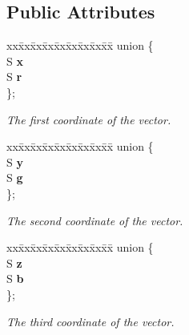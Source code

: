 \subsection*{Public Attributes}
\begin{DoxyCompactItemize}
\item 
\mbox{\label{classmath_1_1_vec3_a540f559cb87f94bfa8b61dbdfa9926c0}} 
\begin{tabbing}
xx\=xx\=xx\=xx\=xx\=xx\=xx\=xx\=xx\=\kill
union \{\\
\>S {\bfseries x}\\
\>S {\bfseries r}\\
\}; \\

\end{tabbing}\begin{DoxyCompactList}\small\item\em The first coordinate of the vector. \end{DoxyCompactList}\item 
\mbox{\label{classmath_1_1_vec3_aceb46a7ac1d3efd1e48179bd823dc298}} 
\begin{tabbing}
xx\=xx\=xx\=xx\=xx\=xx\=xx\=xx\=xx\=\kill
union \{\\
\>S {\bfseries y}\\
\>S {\bfseries g}\\
\}; \\

\end{tabbing}\begin{DoxyCompactList}\small\item\em The second coordinate of the vector. \end{DoxyCompactList}\item 
\mbox{\label{classmath_1_1_vec3_a6c67c986fe777e5dd85a432e46487858}} 
\begin{tabbing}
xx\=xx\=xx\=xx\=xx\=xx\=xx\=xx\=xx\=\kill
union \{\\
\>S {\bfseries z}\\
\>S {\bfseries b}\\
\}; \\

\end{tabbing}\begin{DoxyCompactList}\small\item\em The third coordinate of the vector. \end{DoxyCompactList}\end{DoxyCompactItemize}


